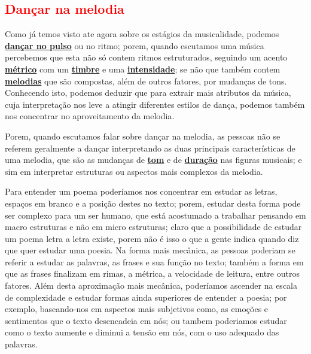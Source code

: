 \subsection{\textcolor{red}{Dançar na melodia}}
\label{subsec:dancamelodia}

Como já temos visto ate agora sobre os estágios da musicalidade, 
podemos \hyperref[subsec:dancapulso]{\textbf{dançar no pulso}}  ou no ritmo;
porem, quando escutamos uma música percebemos que esta não só contem ritmos estruturados, 
seguindo um acento \hyperref[def:Metrica]{\textbf{métrico}} com um \hyperref[sec:pos:timbre]{\textbf{timbre}} 
e uma \hyperref[sec:pos:Intensidade]{\textbf{intensidade}};
se não que também contem \hyperref[sec:pos:Melodia]{\textbf{melodias}} que são compostas, além de outros fatores, 
por mudanças de tons.
Conhecendo isto, 
podemos deduzir que para extrair mais atributos da música,
cuja interpretação nos leve a atingir diferentes estilos de dança,
podemos também nos concentrar no aproveitamento da melodia.


Porem, quando escutamos falar sobre dançar na melodia,
as pessoas não se referem geralmente a dançar interpretando as duas principais características de uma melodia,
que são as mudanças de \hyperref[sec:pos:Altura]{\textbf{tom}} e de
\hyperref[sec:pos:Duracion]{\textbf{duração}} nas figuras musicais;
e sim em interpretar estruturas ou aspectos mais complexos da melodia.


\begin{example}
Para entender um poema poderíamos nos concentrar em estudar as letras, 
espaços em branco  e a posição destes no texto;
porem, estudar desta forma pode ser complexo para um ser humano,
que está acostumado a trabalhar pensando em macro estruturas e não em micro estruturas;
claro que a possibilidade de estudar um poema letra a letra existe,
porem não é isso o que a gente indica quando diz que quer estudar uma poesia.
Na forma mais mecânica, 
as pessoas poderiam se referir a estudar as palavras, as frases e sua função no texto;
também a forma em que as frases finalizam em rimas, a métrica,
a velocidade de leitura, entre outros fatores.
Além desta aproximação mais mecânica, 
poderíamos ascender na escala de complexidade e estudar formas ainda superiores de entender a poesia;
por exemplo, baseando-nos em aspectos mais subjetivos como, 
as emoções e sentimentos  que o texto desencadeia em nós;
ou tambem poderiamos estudar como o texto aumente e diminui a tensão em nós,
 com o uso adequado das palavras.
\end{example}

